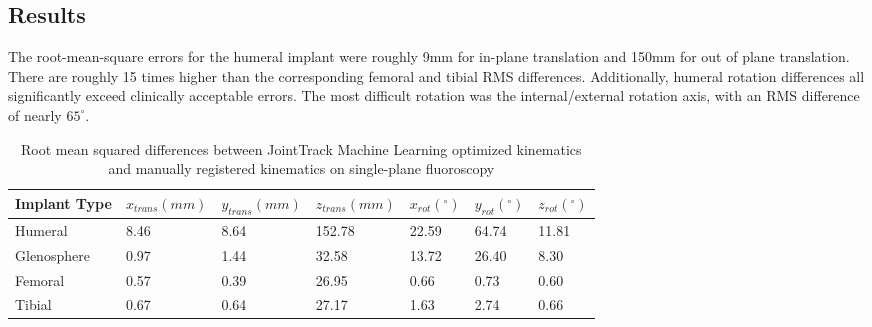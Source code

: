 \subsection{Results}
The root-mean-square errors for the humeral implant were roughly 9mm for in-plane translation and 150mm for out of plane translation.
There are roughly 15 times higher than the corresponding femoral and tibial RMS differences.
Additionally, humeral rotation differences all significantly exceed clinically acceptable errors.
The most difficult rotation was the internal/external rotation axis, with an RMS difference of nearly $65^{\circ}$.
\begin{table}[h!]
	\caption{Root mean squared differences between JointTrack Machine Learning optimized kinematics and manually registered kinematics on single-plane fluoroscopy} \label{tab:jtml-tsa-tka-vals}
	\begin{tabularx}{\linewidth}{V{10cm}XXXXXX}\hline
		 Implant Type & $x_{trans} (mm)$ & $y_{trans} (mm)$ & $z_{trans} (mm)$ & $x_{rot} (^{\circ})$ & $y_{rot} (^{\circ})$ & $z_{rot} (^{\circ})$ \\ \hline
		Humeral            & 8.46             & 8.64             & 152.78           & 22.59                & 64.74                & 11.81                \\
		Glenosphere        & 0.97             & 1.44             & 32.58            & 13.72                & 26.40                & 8.30                 \\
		Femoral            & 0.57             & 0.39             & 26.95            & 0.66                 & 0.73                 & 0.60                 \\
		Tibial             & 0.67             & 0.64             & 27.17            & 1.63                 & 2.74                 & 0.66                 \\\hline
	\end{tabularx}
\end{table}



